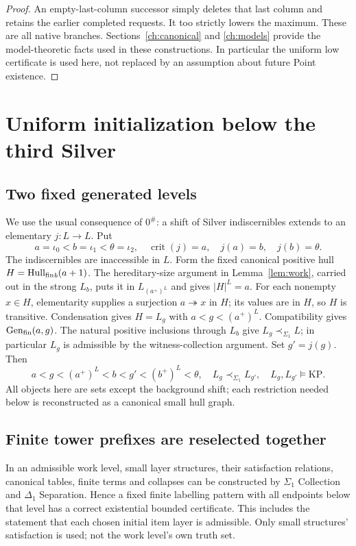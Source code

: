 \begin{proof}
An empty-last-column successor simply deletes that last column
and retains the earlier completed requests. It too strictly lowers
the maximum. These are all native branches. Sections~\ref{ch:canonical} and \ref{ch:models} provide the
model-theoretic facts used in these constructions. In particular the uniform low certificate is used
here, not replaced by an assumption about future Point existence.
\end{proof}



\section{Uniform initialization below the third Silver}\label{ch:initialization}

\subsection{Two fixed generated levels}
We use the usual consequence of $0^\#$: a shift of Silver
indiscernibles extends to an elementary $j:L\to L$. Put
\[
 a=\iota_0<b=\iota_1<\theta=\iota_2,
 \quad \operatorname{crit}(j)=a,\quad j(a)=b,\quad j(b)=\theta.
\]
The indiscernibles are inaccessible in $L$. Form the fixed canonical
positive hull $H=\operatorname{Hull_{fin}}_b(a+1)$. The hereditary-size argument in
Lemma~\ref{lem:work}, carried out in the strong $L_b$, puts it in
$L_{(a^+)^L}$ and gives $|H|^L=a$. For each nonempty $x\in H$,
elementarity supplies a surjection $a\twoheadrightarrow x$ in $H$;
its values are in $H$, so $H$ is transitive. Condensation gives
$H=L_g$ with $a<g<(a^+)^L$. Compatibility gives $\operatorname{Gen_{fin}}(a,g)$.
The natural positive inclusions through $L_b$ give $L_g\prec_{\Sigma_1}L$;
in particular $L_g$ is admissible by the witness-collection argument.
Set $g'=j(g)$. Then
\begin{equation}\label{eq:8-1}
 a<g<(a^+)^L<b<g'<(b^+)^L<\theta,\quad
 L_g\prec_{\Sigma_1}L_{g'},\quad L_g,L_{g'}\models\mathrm{KP}. 
\end{equation}
All objects here are sets except the background shift; each restriction
needed below is reconstructed as a canonical small hull graph.


\subsection{Finite tower prefixes are reselected together}
In an admissible work level, small layer structures, their satisfaction
relations, canonical tables, finite terms and collapses can be
constructed by $\Sigma_1$ Collection and $\Delta_1$ Separation.
Hence a fixed finite labelling pattern with all endpoints below that
level has a correct existential bounded certificate. This includes
the statement that each chosen initial item layer is admissible.
Only small structures' satisfaction is used; not the work level's
own truth set. 

